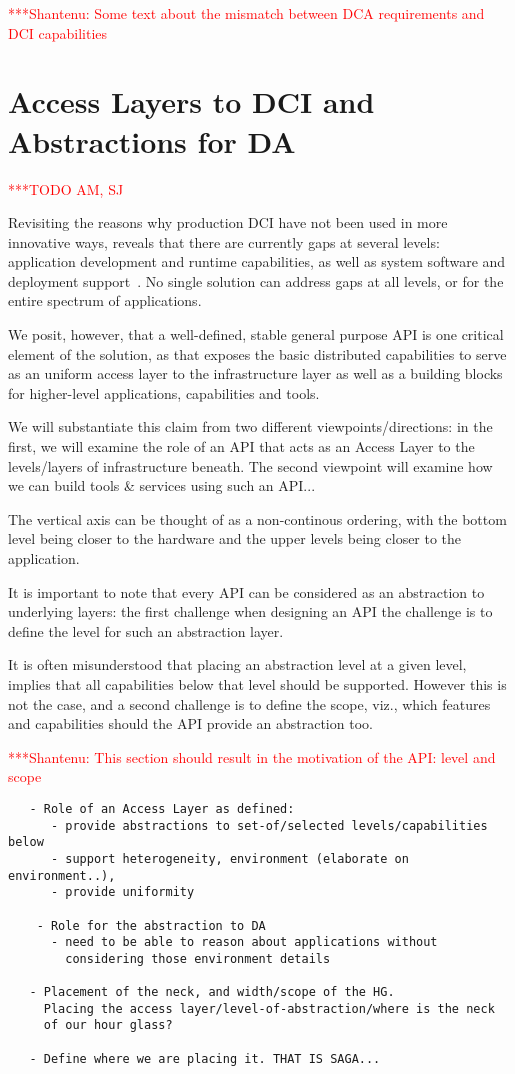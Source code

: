 \documentclass[a4paper,10pt]{article}
\newcommand{\todo}[1]{     {\textcolor{red}  { ***TODO      #1 }}}
\newcommand{\jhanote}[1]{  {\textcolor{red}  { ***Shantenu: #1 }}}
\newcommand{\todo}[1]{}
\newcommand{\jhanote}[1]{}
\begin{document}
 \jhanote{Some text about the mismatch between DCA requirements and
  DCI capabilities}

\section{Access Layers to DCI and Abstractions for DA}\todo{AM, SJ}

Revisiting the reasons why production DCI have not been used in more
innovative ways, reveals that there are currently gaps at several
levels: application development and runtime capabilities, as well as
system software and deployment support~\cite{dpagrid2009}.  No single
solution can address gaps at all levels, or for the entire spectrum of
applications.  

We posit, however, that a well-defined, stable general purpose API is
one critical element of the solution, as that exposes the basic
distributed capabilities to serve as an uniform access layer to the
infrastructure layer as well as a building blocks for higher-level
applications, capabilities and tools.

We will substantiate this claim from two different
viewpoints/directions: in the first, we will examine the role of an
API that acts as an Access Layer to the levels/layers of
infrastructure beneath. The second viewpoint will examine how we can
build tools \& services using such an API...

The vertical axis can be thought of as a non-continous ordering, with
the bottom level being closer to the hardware and the upper levels
being closer to the application.

It is important to note that every API can be considered as an
abstraction to underlying layers: the first challenge when designing
an API the challenge is to define the level for such an abstraction
layer.  

It is often misunderstood that placing an abstraction level at a given
level, implies that all capabilities below that level should be
supported. However this is not the case, and a second challenge is to
define the scope, viz., which features and capabilities should the API
provide an abstraction too.

\jhanote{This section should result in the motivation of the API:
  level and scope}


\begin{verbatim}
   - Role of an Access Layer as defined:
      - provide abstractions to set-of/selected levels/capabilities below
      - support heterogeneity, environment (elaborate on environment..), 
      - provide uniformity

    - Role for the abstraction to DA 
      - need to be able to reason about applications without 
        considering those environment details

   - Placement of the neck, and width/scope of the HG.
     Placing the access layer/level-of-abstraction/where is the neck
     of our hour glass?

   - Define where we are placing it. THAT IS SAGA...
\end{verbatim}
\end{document}
